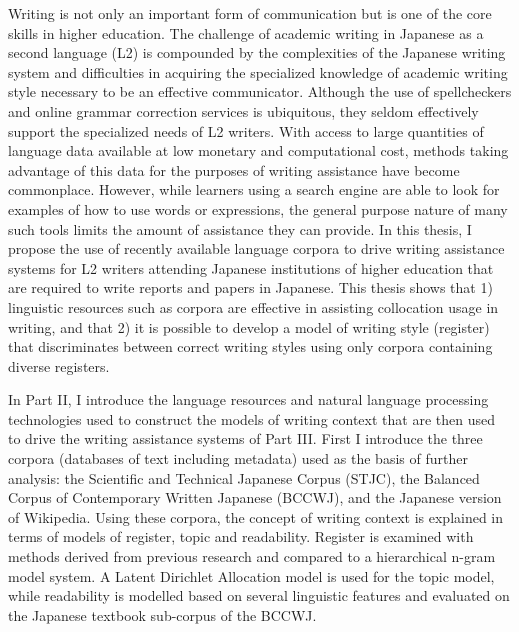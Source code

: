 Writing is not only an important form of communication but is one of the core skills in higher education.
The challenge of academic writing in Japanese as a second language (L2) is compounded by the complexities of the Japanese writing system and difficulties in acquiring the specialized knowledge of academic writing style necessary to be an effective communicator.
Although the use of spellcheckers and online grammar correction services is ubiquitous, they seldom effectively support the specialized needs of L2 writers.
With access to large quantities of language data available at low monetary and computational cost, methods taking advantage of this data for the purposes of writing assistance have become commonplace.
However, while learners using a search engine are able to look for examples of how to use words or expressions, the general purpose nature of many such tools limits the amount of assistance they can provide.
In this thesis, I propose the use of recently available language corpora to drive writing assistance systems for L2 writers attending Japanese institutions of higher education that are required to write reports and papers in Japanese.
This thesis shows that 1) linguistic resources such as corpora are effective in assisting collocation usage in writing, and that 2) it is possible to develop a model of writing style (register) that discriminates between correct writing styles using only corpora containing diverse registers.

In Part II, I introduce the language resources and natural language processing technologies used to construct the models of writing context that are then used to drive the writing assistance systems of Part III.
First I introduce the three corpora (databases of text including metadata) used as the basis of further analysis: the Scientific and Technical Japanese Corpus (STJC), the Balanced Corpus of Contemporary Written Japanese (BCCWJ), and the Japanese version of Wikipedia.
Using these corpora, the concept of writing context is explained in terms of models of register, topic and readability.
Register is examined with methods derived from previous research and compared to a hierarchical n-gram model system.
A Latent Dirichlet Allocation model is used for the topic model, while readability is modelled based on several linguistic features and evaluated on the Japanese textbook sub-corpus of the BCCWJ.

